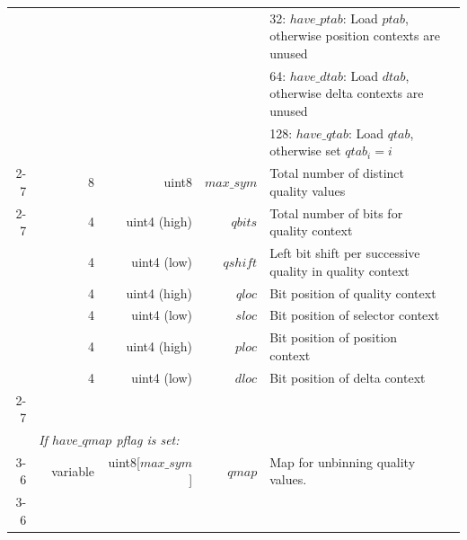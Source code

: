 \documentclass[a4paper]{article}
\begin{document}
\begin{table}
\begin{tabular}{|r|r|r|r|r|p{8cm}|l|l|}
                       & \multicolumn{2}{r|}{}         &                &                                & \multicolumn{2}{p{8.4cm}|}{32: $have\_ptab$: Load $ptab$, otherwise position contexts are unused} & \\
                       & \multicolumn{2}{r|}{}         &                &                                & \multicolumn{2}{p{8.4cm}|}{64: $have\_dtab$: Load $dtab$, otherwise delta contexts are unused} & \\
                       & \multicolumn{2}{r|}{}         &                &                                & \multicolumn{2}{p{8.4cm}|}{128: $have\_qtab$: Load $qtab$, otherwise set $qtab_i = i$} &\\
\cline{2-7}
                       & \multicolumn{2}{r|}{8}        & uint8          & $max\_sym$                     & \multicolumn{2}{p{8.4cm}|}{Total number of distinct quality values} & \\
\cline{2-7}
                       & \multicolumn{2}{r|}{4}        & uint4 (high)   & $qbits$                        & \multicolumn{2}{p{8.4cm}|}{Total number of bits for quality context} & \\
                       & \multicolumn{2}{r|}{4}        & uint4 (low)    & $qshift$                       & \multicolumn{2}{p{8.4cm}|}{Left bit shift per successive quality in quality context} & \\
                       & \multicolumn{2}{r|}{4}        & uint4 (high)   & $qloc$                         & \multicolumn{2}{p{8.4cm}|}{Bit position of quality context} & \\
                       & \multicolumn{2}{r|}{4}        & uint4 (low)    & $sloc$                         & \multicolumn{2}{p{8.4cm}|}{Bit position of selector context} & \\
                       & \multicolumn{2}{r|}{4}        & uint4 (high)   & $ploc$                         & \multicolumn{2}{p{8.4cm}|}{Bit position of position context} & \\
                       & \multicolumn{2}{r|}{4}        & uint4 (low)    & $dloc$                         & \multicolumn{2}{p{8.4cm}|}{Bit position of delta context }& \\
\cline{2-7}

& \multicolumn{6}{l|}{} & \\[-0.7em]
\multicolumn{1}{|l|}{} & \multicolumn{6}{l|}{ \textit{If $have\_qmap$ pflag is set:} } & \\
\cline{3-6}
                       &  & variable                   & uint8[$max\_sym$]          & $qmap$             & Map for unbinning quality values. & & \\
\cline{3-6}


\end{tabular}
\end{table}
\end{document}
